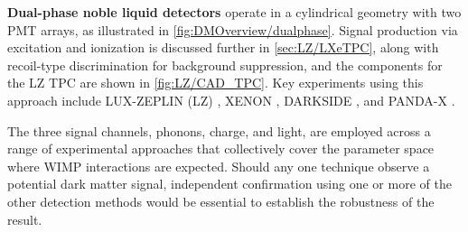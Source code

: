 \begin{itemize}
    \textbf{Dual-phase noble liquid detectors} operate in a cylindrical geometry with two PMT arrays, as illustrated in \autoref{fig:DMOverview/dualphase}. Signal production via excitation and ionization is discussed further in \autoref{sec:LZ/LXeTPC}, along with recoil-type discrimination for background suppression, and the components for the LZ TPC are shown in \autoref{fig:LZ/CAD_TPC}. Key experiments using this approach include LUX-ZEPLIN (LZ) \cite{LZNIMA}, XENON \cite{XENON:2025vwd}, DARKSIDE \cite{DarkSide-20k:2017zyg}, and PANDA-X \cite{PandaX-4T:2021bab}.
\end{itemize}
\noindent
The three signal channels, phonons, charge, and light, are employed across a range of experimental approaches that collectively cover the parameter space where WIMP interactions are expected. Should any one technique observe a potential dark matter signal, independent confirmation using one or more of the other detection methods would be essential to establish the robustness of the result.

\pagebreak

